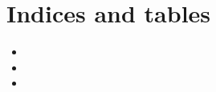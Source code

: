 \documentclass[letterpaper,10pt,english]{sphinxmanual}
\begin{document}
\begin{savenotes}\sphinxattablestart
\sphinxthistablewithglobalstyle
\sphinxthistablewithnovlinesstyle
\centering
\begin{tabulary}{\linewidth}[t]{}
\sphinxtoprule
\sphinxtableatstartofbodyhook\sphinxbottomrule
\end{tabulary}
\sphinxtableafterendhook\par
\sphinxattableend\end{savenotes}


\chapter{Indices and tables}
\label{\detokenize{index:indices-and-tables}}\begin{itemize}
\item {} 
\sphinxAtStartPar
{}

\item {} 
\sphinxAtStartPar
{}

\item {} 
\sphinxAtStartPar
{}

\end{itemize}



\renewcommand{\indexname}{Index}
\printindex
\end{document}
